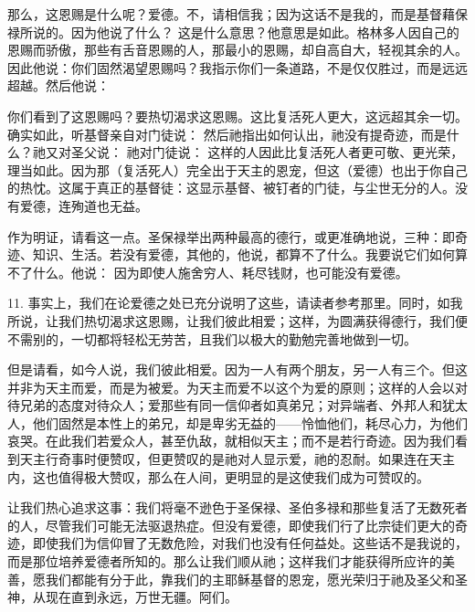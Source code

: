 那么，这恩赐是什么呢？爱德。不，请相信我；因为这话不是我的，而是基督藉保禄所说的。因为他说了什么？ 这是什么意思？他意思是如此。格林多人因自己的恩赐而骄傲，那些有舌音恩赐的人，那最小的恩赐，却自高自大，轻视其余的人。因此他说：你们固然渴望恩赐吗？我指示你们一条道路，不是仅仅胜过，而是远远超越。然后他说：\par

你们看到了这恩赐吗？要热切渴求这恩赐。这比复活死人更大，这远超其余一切。确实如此，听基督亲自对门徒说： 然后祂指出如何认出，祂没有提奇迹，而是什么？祂又对圣父说： 祂对门徒说： 这样的人因此比复活死人者更可敬、更光荣，理当如此。因为那（复活死人）完全出于天主的恩宠，但这（爱德）也出于你自己的热忱。这属于真正的基督徒：这显示基督、被钉者的门徒，与尘世无分的人。没有爱德，连殉道也无益。\par

作为明证，请看这一点。圣保禄举出两种最高的德行，或更准确地说，三种：即奇迹、知识、生活。若没有爱德，其他的，他说，都算不了什么。我要说它们如何算不了什么。他说： 因为即使人施舍穷人、耗尽钱财，也可能没有爱德。\par

11. 事实上，我们在论爱德之处已充分说明了这些，请读者参考那里。同时，如我所说，让我们热切渴求这恩赐，让我们彼此相爱；这样，为圆满获得德行，我们便不需别的，一切都将轻松无劳苦，且我们以极大的勤勉完善地做到一切。\par

但是请看，如今人说，我们彼此相爱。因为一人有两个朋友，另一人有三个。但这并非为天主而爱，而是为被爱。为天主而爱不以这个为爱的原则；这样的人会以对待兄弟的态度对待众人；爱那些有同一信仰者如真弟兄；对异端者、外邦人和犹太人，他们固然是本性上的弟兄，却是卑劣无益的——怜恤他们，耗尽心力，为他们哀哭。在此我们若爱众人，甚至仇敌，就相似天主；而不是若行奇迹。因为我们看到天主行奇事时便赞叹，但更赞叹的是祂对人显示爱，祂的忍耐。如果连在天主内，这也值得极大赞叹，那么在人间，更明显的是这使我们成为可赞叹的。\par

让我们热心追求这事：我们将毫不逊色于圣保禄、圣伯多禄和那些复活了无数死者的人，尽管我们可能无法驱退热症。但没有爱德，即使我们行了比宗徒们更大的奇迹，即使我们为信仰冒了无数危险，对我们也没有任何益处。这些话不是我说的，而是那位培养爱德者所知的。那么让我们顺从祂；这样我们才能获得所应许的美善，愿我们都能有分于此，靠我们的主耶稣基督的恩宠，愿光荣归于祂及圣父和圣神，从现在直到永远，万世无疆。阿们。\par

